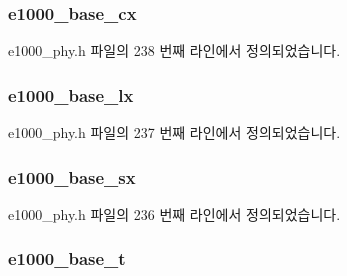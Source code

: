 \subsubsection[{\texorpdfstring{e1000\+\_\+base\+\_\+cx}{e1000_base_cx}}]{ e1000\+\_\+base\+\_\+cx}\hypertarget{structsfp__e1000__flags_a14d046dc02f3e95cf0adf5e515747061}{}\label{structsfp__e1000__flags_a14d046dc02f3e95cf0adf5e515747061}


e1000\+\_\+phy.\+h 파일의 238 번째 라인에서 정의되었습니다.

\subsubsection[{\texorpdfstring{e1000\+\_\+base\+\_\+lx}{e1000_base_lx}}]{ e1000\+\_\+base\+\_\+lx}\hypertarget{structsfp__e1000__flags_a686f63adc762ddb9ff673d2ecadac4d0}{}\label{structsfp__e1000__flags_a686f63adc762ddb9ff673d2ecadac4d0}


e1000\+\_\+phy.\+h 파일의 237 번째 라인에서 정의되었습니다.

\subsubsection[{\texorpdfstring{e1000\+\_\+base\+\_\+sx}{e1000_base_sx}}]{ e1000\+\_\+base\+\_\+sx}\hypertarget{structsfp__e1000__flags_a4e276001866eae0d229e569535fff65d}{}\label{structsfp__e1000__flags_a4e276001866eae0d229e569535fff65d}


e1000\+\_\+phy.\+h 파일의 236 번째 라인에서 정의되었습니다.

\subsubsection[{\texorpdfstring{e1000\+\_\+base\+\_\+t}{e1000_base_t}}]{ e1000\+\_\+base\+\_\+t}\hypertarget{structsfp__e1000__flags_a255e0b7f3ea786b0fcd2036eb670fc47}{}\label{structsfp__e1000__flags_a255e0b7f3ea786b0fcd2036eb670fc47}



